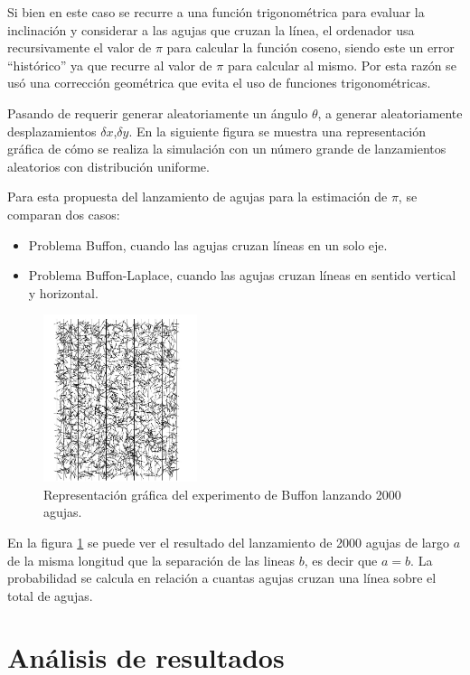 \documentclass{rbf}
\begin{document}
Si bien en este caso se recurre a una función trigonométrica para evaluar la inclinación y considerar a las agujas que cruzan la línea, el ordenador usa recursivamente el valor de $\pi$ para calcular la función coseno, siendo este un error “histórico” ya que recurre al valor de $\pi$ para calcular al mismo. Por esta razón se usó una corrección geométrica que evita el uso de funciones trigonométricas.

Pasando de requerir generar aleatoriamente un ángulo $\theta$, a generar aleatoriamente desplazamientos $\delta x$,$\delta y$. En la siguiente figura se muestra una representación gráfica de cómo se realiza la simulación con un número grande de lanzamientos aleatorios con distribución uniforme. \cite{Statistics}

Para esta propuesta del lanzamiento de agujas para la estimación de $\pi$, se comparan dos casos:
\begin{itemize}
    \item Problema Buffon, cuando las agujas cruzan líneas en un solo eje.
    \item Problema Buffon-Laplace, cuando las agujas cruzan líneas en sentido vertical y horizontal.
\end{itemize}

\begin{figure}[tbp!]
 \centering
  \includegraphics[width=0.4\textwidth]{figures/buffon.jpg}
	\caption{Representación gráfica del experimento de Buffon lanzando 2000 agujas.\cite{Statistics}}
 \label{buff}
\end{figure}


En la figura \ref{buff} se puede ver el resultado del lanzamiento de 2000 agujas de largo $a$ de la misma longitud que la separación de las lineas $b$, es decir que $a=b$. La probabilidad se calcula en relación a cuantas agujas cruzan una línea sobre el total de agujas. 


\section{Análisis de resultados}
\end{document}
